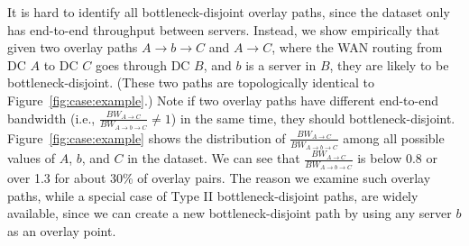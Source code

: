 It is hard to identify all bottleneck-disjoint overlay paths,
since the dataset only has end-to-end throughput between
servers.
Instead, we show empirically that given two overlay
paths $A$$\rightarrow$$b$$\rightarrow$$C$ and $A$$\rightarrow$$C$,
where the WAN routing from DC $A$ to DC $C$ goes through DC $B$,
and $b$ is a server in $B$, they are likely to be
bottleneck-disjoint.
(These two paths are topologically identical to
Figure~\ref{fig:case:example}.)
Note if two overlay paths have different end-to-end bandwidth
(i.e., $\frac{BW_{A\rightarrow C}}{BW_{A\rightarrow b\rightarrow C}}\neq1$)
in the same time,
they should bottleneck-disjoint.
Figure~\ref{fig:case:example} shows the distribution of
$\frac{BW_{A\rightarrow C}}{BW_{A\rightarrow b\rightarrow C}}$
among all possible values of $A$, $b$, and $C$ in the dataset.
We can see that $\frac{BW_{A\rightarrow C}}{BW_{A\rightarrow b\rightarrow C}}$ is
below 0.8 or over 1.3 for about 30\% of overlay pairs.
The reason we examine such overlay paths, while a special case of Type 
II bottleneck-disjoint paths, are widely available, since we can
create a new bottleneck-disjoint path by using any server $b$
as an overlay point.



